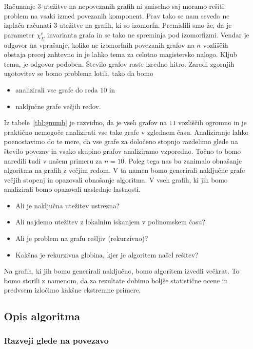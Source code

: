 \documentclass[12pt,a4paper,twoside]{article}
\theoremstyle{definition} %
\theoremstyle{plain} %
\newcommand{\ec}{\chi_{\Sigma}^e}
\numberwithin{equation}{section}  %
\begin{document}
 Računanje $3$-utežitve na nepovezanih grafih ni smiselno saj moramo rešiti problem na vsaki izmed povezanih komponent. Prav tako se nam seveda ne izplača računati $3$-utežitve na grafih, ki so izomorfn. Premislili smo že, da je parameter $\ec$ invarianta grafa in se tako ne spreminja pod izomorfizmi. Vendar je odgovor na vprašanje, koliko ne izomorfnih povezanih grafov na $n$ vozliščih obstaja precej zahtevno in je lahko tema za celotno magistersko nalogo. Kljub temu, je odgovor podoben. Število grafov raste izredno hitro. Zaradi zgornjih ugotovitev se bomo problema lotili, tako da bomo
\begin{itemize}
\item analizirali vse grafe do reda $10$ in
\item naključne grafe večjih redov.
\end{itemize}
Iz tabele~\ref{tbl:gnumb} je razvidno, da je vseh grafov na $11$ vozliščih ogromno in je praktično nemogoče analizirati vse take grafe v zglednem času. Analiziranje lahko poenostavimo do te mere, da vse grafe za določeno stopnjo razdelimo glede na število povezav in vsako skupino grafov analiziramo vzporedno. Točno to bomo naredili tudi v našem primeru za $n=10$. Poleg tega nas bo zanimalo obnašanje algoritma na grafih z večjim redom. V ta namen bomo generirali naključne grafe večjih stopenj in opazovali obnašanje algoritma. V vseh grafih, ki jih bomo analizirali bomo opazovali naslednje lastnosti.
\begin{itemize}
\item Ali je naključna utežitev  ustrezna?
\item Ali najdemo utežitev z lokalnim iskanjem v polinomskem času?
\item Ali je problem na grafu rešljiv (rekurzivno)?
\item Kakšna je rekurzivna globina, kjer je algoritem našel rešitev?
\end{itemize}
Na grafih, ki jih bomo generirali naključno, bomo algoritem izvedli večkrat. To bomo storili z namenom, da za rezultate dobimo boljše statistične ocene in predvsem izločimo kakšne ekstremne primere.

\subsection{Opis algoritma}
\subsubsection{Razveji glede na povezavo}
\end{document}
